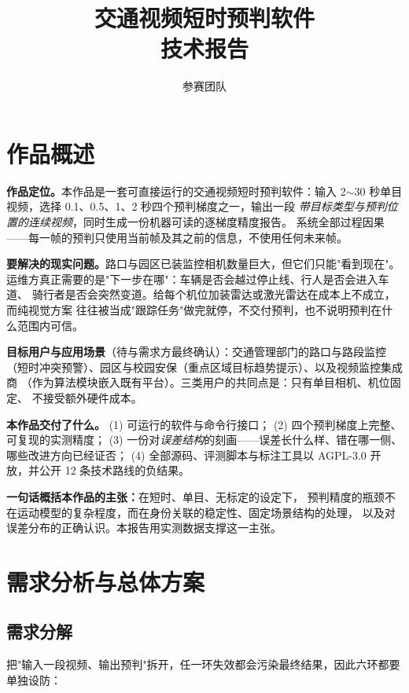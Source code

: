 \documentclass[11pt,a4paper]{ctexart}
\title{交通视频短时预判软件\\\large 技术报告}
\author{参赛团队}
\date{}
\begin{document}
\maketitle
\vspace{-1.4em}

\section{作品概述}

\textbf{作品定位。}本作品是一套可直接运行的交通视频短时预判软件：输入
2$\sim$30 秒单目视频，选择 0.1、0.5、1、2 秒四个预判梯度之一，输出一段
\emph{带目标类型与预判位置的连续视频}，同时生成一份机器可读的逐梯度精度报告。
系统全部过程因果——每一帧的预判只使用当前帧及其之前的信息，不使用任何未来帧。

\textbf{要解决的现实问题。}路口与园区已装监控相机数量巨大，但它们只能"看到现在"。
运维方真正需要的是"下一步在哪"：车辆是否会越过停止线、行人是否会进入车道、
骑行者是否会突然变道。给每个机位加装雷达或激光雷达在成本上不成立，而纯视觉方案
往往被当成"跟踪任务"做完就停，不交付预判，也不说明预判在什么范围内可信。

\textbf{目标用户与应用场景}（待与需求方最终确认）：交通管理部门的路口与路段监控
（短时冲突预警）、园区与校园安保（重点区域目标趋势提示）、以及视频监控集成商
（作为算法模块嵌入既有平台）。三类用户的共同点是：只有单目相机、机位固定、
不接受额外硬件成本。

\textbf{本作品交付了什么。}
(1) 可运行的软件与命令行接口；
(2) 四个预判梯度上完整、可复现的实测精度；
(3) 一份对\emph{误差结构}的刻画——误差长什么样、错在哪一侧、哪些改进方向已经证否；
(4) 全部源码、评测脚本与标注工具以 AGPL-3.0 开放，并公开 12 条技术路线的负结果。

\textbf{一句话概括本作品的主张：}在短时、单目、无标定的设定下，
预判精度的瓶颈不在运动模型的复杂程度，而在身份关联的稳定性、固定场景结构的处理，
以及对误差分布的正确认识。本报告用实测数据支撑这一主张。

\section{需求分析与总体方案}

\subsection{需求分解}

把"输入一段视频、输出预判"拆开，任一环失效都会污染最终结果，因此六环都要单独设防：
\end{document}
